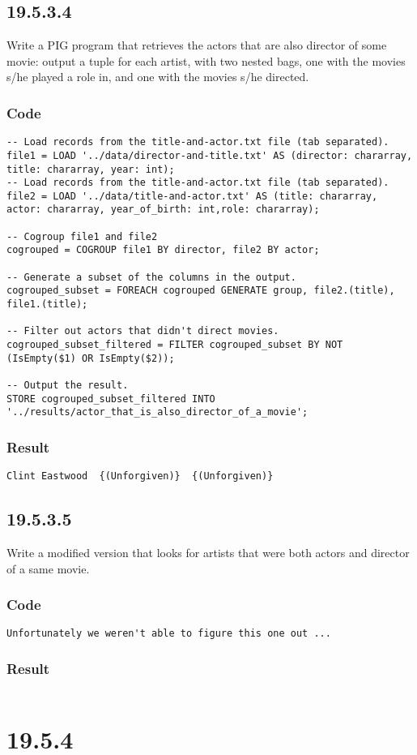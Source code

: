 \documentclass[a4paper, notitlepage]{article}
\begin{document}
\subsection{19.5.3.4}

Write a PIG program that retrieves the actors that are also director of some movie: output a tuple for each artist, with two nested bags, one with the movies s/he played a role in, and one with the movies s/he directed.

\subsubsection{Code}

\begin{lstlisting}
-- Load records from the title-and-actor.txt file (tab separated).
file1 = LOAD '../data/director-and-title.txt' AS (director: chararray, title: chararray, year: int);
-- Load records from the title-and-actor.txt file (tab separated).
file2 = LOAD '../data/title-and-actor.txt' AS (title: chararray, actor: chararray, year_of_birth: int,role: chararray);

-- Cogroup file1 and file2
cogrouped = COGROUP file1 BY director, file2 BY actor;

-- Generate a subset of the columns in the output.
cogrouped_subset = FOREACH cogrouped GENERATE group, file2.(title), file1.(title);

-- Filter out actors that didn't direct movies.
cogrouped_subset_filtered = FILTER cogrouped_subset BY NOT (IsEmpty($1) OR IsEmpty($2));

-- Output the result.
STORE cogrouped_subset_filtered INTO '../results/actor_that_is_also_director_of_a_movie';
\end{lstlisting}

\subsubsection{Result}

\begin{lstlisting}
Clint Eastwood	{(Unforgiven)}	{(Unforgiven)}
\end{lstlisting}

\subsection{19.5.3.5}

Write a modified version that looks for artists that were both actors and director of a same movie.

\subsubsection{Code}

\begin{lstlisting}
Unfortunately we weren't able to figure this one out ...
\end{lstlisting}

\subsubsection{Result}

\begin{lstlisting}

\end{lstlisting}

\section{19.5.4}
\end{document}
